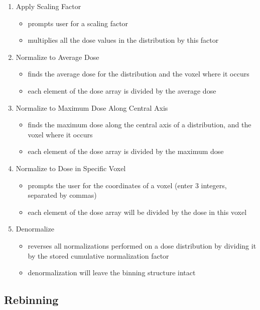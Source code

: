 \documentclass[12pt,twoside]{article}
\begin{document}
\begin{enumerate}
\item Apply Scaling Factor
\begin{itemize}
\item prompts user for a scaling factor
\item multiplies all the dose values in the distribution by this factor
\end{itemize}
\item Normalize to Average Dose
\begin{itemize}
\item finds the average dose for the distribution and the voxel where it occurs
\item each element of the dose array is divided by the average dose
\end{itemize}
\item Normalize to Maximum Dose Along Central Axis
\begin{itemize}
\item finds the maximum dose along the central axis of a distribution, and the voxel where it occurs
\item each element of the dose array is divided by the maximum dose
\end{itemize}
\item Normalize to Dose in Specific Voxel
\begin{itemize}
\item prompts the user for the coordinates of a voxel (enter 3 integers, separated by commas)
\item each element of the dose array will be divided by the dose in this
voxel
\end{itemize}
\item Denormalize
\begin{itemize}
\item reverses all normalizations performed on a dose distribution by dividing it by the stored cumulative normalization factor
\item denormalization will leave the binning structure intact
\end{itemize}
\end{enumerate}



\subsection{Rebinning}
\end{document}
